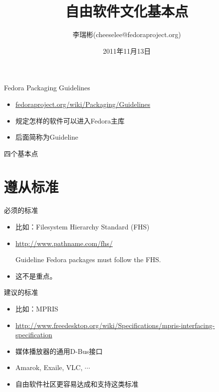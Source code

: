 \documentclass[handout,CJK,xetex]{beamer}
\title{自由软件文化基本点}
\author[李瑞彬]{李瑞彬(cheeselee@fedoraproject.org)}
\date{2011年11月13日}
\begin{document}
\frame{\titlepage}

\begin{frame}{Fedora Packaging Guidelines}
  \begin{itemize}
  \item \url{fedoraproject.org/wiki/Packaging/Guidelines}
  \item 规定怎样的软件可以进入Fedora主库
  \item 后面简称为Guideline
  \end{itemize}
\end{frame}


\begin{frame}{四个基本点}
  \tableofcontents[hideallsubsections]
\end{frame}


\section{遵从标准}
\begin{frame}{必须的标准}
\begin{itemize}[<+->]
  \item 比如：Filesystem Hierarchy Standard (FHS)
  \item \url{http://www.pathname.com/fhs/}
    \begin{block}{Guideline}
      Fedora packages must follow the FHS.
    \end{block}
  \item 这不是重点。
\end{itemize}
\end{frame}

\begin{frame}{建议的标准}
\begin{itemize}[<+->]
  \item 比如：MPRIS
  \item \url{http://www.freedesktop.org/wiki/Specifications/mpris-interfacing-specification}
  \item 媒体播放器的通用D-Bus接口
  \item Amarok, Exaile, VLC, $\cdots$
  \item 自由软件社区更容易达成和支持这类标准
\end{itemize}
\end{frame}
\end{document}
